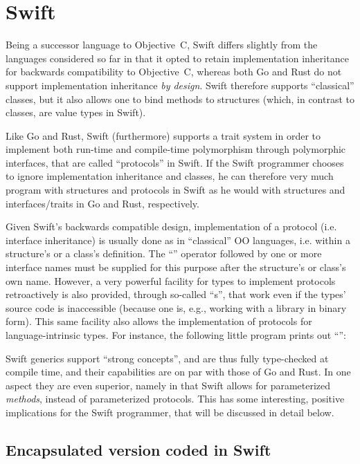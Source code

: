 \documentclass[11pt,oneside]{report}
\newcommand{\code}[1]{{\selectfont\ttfamily{#1}}}
\begin{document}
\section{Swift}

Being a successor language to Objective~C, Swift differs slightly from
the languages considered so far in that it opted to retain
implementation inheritance for backwards compatibility to Objective~C,
whereas both Go and Rust do not support implementation inheritance
\emph{by design}. Swift therefore supports ``classical'' classes, but
it also allows one to bind methods to structures (which, in contrast
to classes, are value types in Swift).

Like Go and Rust, Swift (furthermore) supports a trait system in order
to implement both run-time and compile-time polymorphism through
polymorphic interfaces, that are called ``protocols'' in Swift. If the
Swift programmer chooses to ignore implementation inheritance and
classes, he can therefore very much program with structures and
protocols in Swift as he would with structures and interfaces/traits
in Go and Rust, respectively.

Given Swift's backwards compatible design, implementation of a
protocol (i.e. interface inheritance) is usually done as in
``classical'' OO languages, i.e. within a structure's or a class's
definition. The ``\code{:}'' operator followed by one or more
interface names must be supplied for this purpose after the
structure's or class's own name. However, a very powerful facility for
types to implement protocols retroactively is also provided, through
so-called ``\code{extension}s'', that work even if the types' source
code is inaccessible (because one is, e.g., working with a library in
binary form). This same facility also allows the implementation of
protocols for language-intrinsic types. For instance, the following
little program prints out ``\code{I am 4.9}'':


Swift generics support ``strong concepts'', and are thus fully
type-checked at compile time, and their capabilities are on par with
those of Go and Rust. In one aspect they are even superior, namely in
that Swift allows for parameterized \emph{methods}, instead of
parameterized protocols. This has some interesting, positive
implications for the Swift programmer, that will be discussed in
detail below.

\subsection{Encapsulated version coded in Swift}
\end{document}
